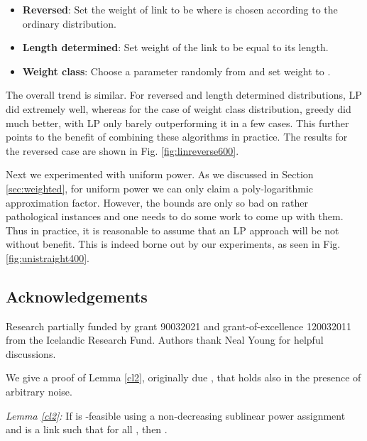 \documentclass[11pt]{amsart}
\begin{document}
\begin{itemize}
\item {\bf Reversed}: Set the weight of link  to be  where  is chosen according to the ordinary distribution.
\item {\bf Length determined}: Set weight of the link to be equal to its length.
\item {\bf Weight class}: Choose a parameter  randomly from  and set weight to .
\end{itemize}
The overall trend is similar. For reversed and  length determined distributions, LP did extremely well, whereas for the case
of weight class distribution, greedy did much better, with LP only barely outperforming it in a few cases. This further points to
the benefit of combining these algorithms in practice. The results for the reversed case are shown in Fig. \ref{fig:linreverse600}.

Next we experimented with uniform power. As we discussed in Section \ref{sec:weighted}, for uniform power we can only claim a poly-logarithmic approximation factor. However, the bounds are only so bad on rather pathological instances and one needs to do some work to come up with them. Thus in practice, it is reasonable to assume that an LP approach will be not without benefit.
  This is indeed borne out by our experiments, as seen in Fig. \ref{fig:unistraight400}.

\subsection*{Acknowledgements}
Research partially funded by grant 90032021 and grant-of-excellence 120032011 from the Icelandic Research Fund.
Authors thank Neal Young for helpful discussions.

\vspace*{20pt}



		


\appendix






We give a proof of Lemma \ref{cl2}, originally due \cite{KV10}, that holds
also in the presence of arbitrary noise.

\emph{Lemma \ref{cl2}:}
If  is -feasible using a non-decreasing sublinear power
assignment and   is a link such that  for all , then .
\smallskip
\end{document}
